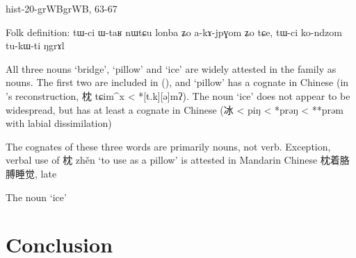 \documentclass[oldfontcommands,oneside,a4paper,11pt]{article}
\newcommand{\ipa}[1]{{\phon \mbox{#1}}} %
\newcommand{\zh}[1]{{\cn #1}}
\begin{document}
hist-20-grWBgrWB, 63-67

 


Folk definition:
\ipa{tɯ-ci}  	\ipa{ɯ-taʁ}  	\ipa{nɯtɕu}  	\ipa{lonba}  	\ipa{ʑo}  	\ipa{a-kɤ-jpɣom}  	\ipa{ʑo}  	\ipa{tɕe,}  	\ipa{tɯ-ci}  	\ipa{ko-ndzom}  	\ipa{tu-kɯ-ti}  	\ipa{ŋgrɤl}  	



All three nouns `bridge',  `pillow' and `ice' are widely attested in the family as nouns. The first two are included in (\citealt[257, 272]{matisoff03}), and `pillow' has a cognate in Chinese (in \citealt{bs14oc}'s reconstruction, \zh{枕} \ipa{tɕim^x} < *\ipa{[t.k][ə]mʔ}). The noun `ice' does not appear to be widespread, but has at least a cognate in Chinese (\zh{冰} < \ipa{piŋ} < *\ipa{prəŋ} <  **\ipa{prəm} with labial dissimilation)

The cognates of these three words are primarily nouns, not verb.
Exception, verbal use of \zh{枕} \ipa{zhěn} `to use as a pillow' is attested in Mandarin Chinese \zh{枕着胳膊睡觉}, late

The noun `ice'
\citet{jacques14esquisse}




\section{Conclusion}




 
\end{document}
